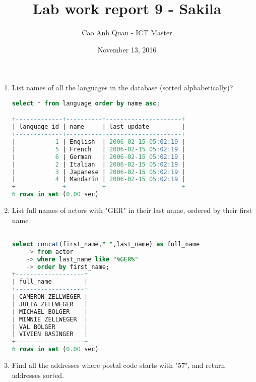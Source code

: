 \documentclass[12pt]{article}
\title{Lab work report 9 - Sakila}
\author{Cao Anh Quan - ICT Master}
\date{November 13, 2016}
\begin{document}
 
\begin{titlepage}
\maketitle
\end{titlepage}

\begin{enumerate}

\item List names of all the languages in the database (sorted alphabetically)?

\begin{lstlisting}[language=SQL]
select * from language order by name asc;

+-------------+----------+---------------------+
| language_id | name     | last_update         |
+-------------+----------+---------------------+
|           1 | English  | 2006-02-15 05:02:19 |
|           5 | French   | 2006-02-15 05:02:19 |
|           6 | German   | 2006-02-15 05:02:19 |
|           2 | Italian  | 2006-02-15 05:02:19 |
|           3 | Japanese | 2006-02-15 05:02:19 |
|           4 | Mandarin | 2006-02-15 05:02:19 |
+-------------+----------+---------------------+
6 rows in set (0.00 sec)


\end{lstlisting}

\item List full names of actors with "GER" in their last name, ordered by their first name

\begin{lstlisting}[language=SQL]

select concat(first_name," ",last_name) as full_name 
    -> from actor 
    -> where last_name like "%GER%" 
    -> order by first_name;
+-------------------+
| full_name         |
+-------------------+
| CAMERON ZELLWEGER |
| JULIA ZELLWEGER   |
| MICHAEL BOLGER    |
| MINNIE ZELLWEGER  |
| VAL BOLGER        |
| VIVIEN BASINGER   |
+-------------------+
6 rows in set (0.00 sec)

\end{lstlisting}

\item Find all the addresses where postal code starts with "57", and return addresses sorted.


\end{enumerate}
\end{document}
